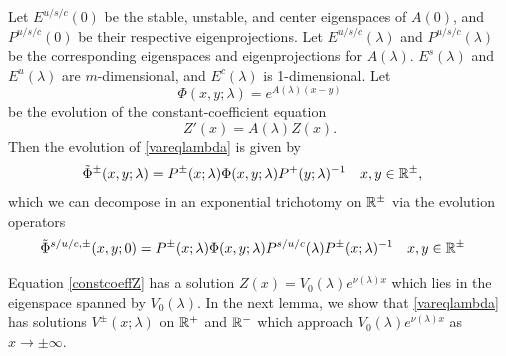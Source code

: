 \documentclass[10pt,reqno]{amsart}
\theoremstyle{plain}
\theoremstyle{definition}
\theoremstyle{remark}
\numberwithin{theorem}{section}
\numberwithin{equation}{section}
\begin{document}
Let $E^{u/s/c}(0)$ be the stable, unstable, and center eigenspaces of $A(0)$, and $P^{u/s/c}(0)$ be their respective eigenprojections. Let $E^{u/s/c}(\lambda)$ and $P^{u/s/c}(\lambda)$ be the corresponding eigenspaces and eigenprojections for $A(\lambda)$. $E^s(\lambda)$ and $E^u(\lambda)$ are $m$-dimensional, and $E^c(\lambda)$ is 1-dimensional. Let
\begin{equation}\label{defPhi}
\Phi(x, y; \lambda) = e^{A(\lambda)(x-y)}
\end{equation}
be the evolution of the constant-coefficient equation
\begin{equation}\label{constcoeffZ}
Z'(x) = A(\lambda) Z(x).
\end{equation}
Then the evolution of \cref{vareqlambda} is given by
\begin{align}\label{deftildephi}
\tilde{\Phi}^\pm(x, y; \lambda) &= P^\pm(x; \lambda) \Phi(x, y; \lambda) P^+(y; \lambda)^{-1} && x, y \in \mathbb{R}^\pm,
\end{align}
which we can decompose in an exponential trichotomy on $\mathbb{R}^\pm$ via the evolution operators
\begin{align}\label{tildephitrich}
\tilde{\Phi}^{s/u/c, \pm}(x, y; 0) &= P^\pm(x; \lambda) \Phi(x, y; \lambda) P^{s/u/c}(\lambda) P^\pm(x; \lambda)^{-1} && x, y \in \mathbb{R}^\pm
\end{align}

Equation \cref{constcoeffZ} has a solution $Z(x) = V_0(\lambda)e^{\nu(\lambda)x}$ which lies in the eigenspace spanned by $V_0(\lambda)$. In the next lemma, we show that \cref{vareqlambda} has solutions $V^\pm(x; \lambda)$ on $\mathbb{R}^+$ and $\mathbb{R}^-$ which approach $V_0(\lambda)e^{\nu(\lambda)x}$ as $x \rightarrow \pm \infty$. 
\end{document}
